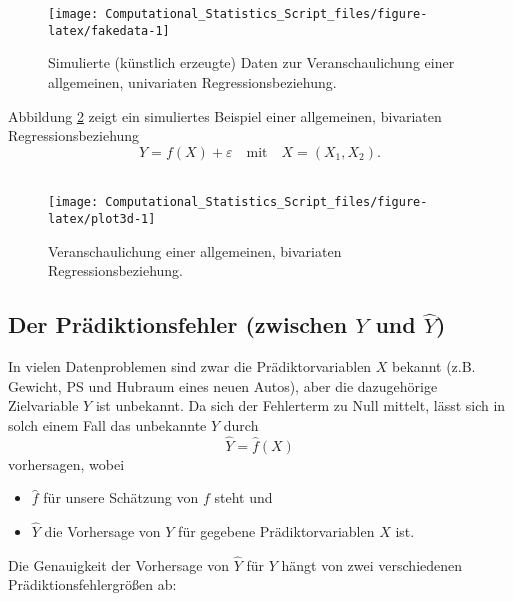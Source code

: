 \documentclass[
  ngerman,
]{book}
\providecommand{\tightlist}{%
  \setlength{\itemsep}{0pt}\setlength{\parskip}{0pt}}
\begin{document}
\begin{figure}[h]

{\centering \texttt{[image: Computational\_Statistics\_Script\_files/figure-latex/fakedata-1]} 

}

\caption{Simulierte (künstlich erzeugte) Daten zur Veranschaulichung einer allgemeinen, univariaten Regressionsbeziehung.}\label{fig:fakedata}
\end{figure}

Abbildung \ref{fig:plot3d} zeigt ein simuliertes Beispiel einer allgemeinen, bivariaten Regressionsbeziehung
\[
Y=f(X)+\varepsilon\quad\text{mit}\quad X=(X_1,X_2).
\]\\

\begin{figure}[h]

{\centering \texttt{[image: Computational\_Statistics\_Script\_files/figure-latex/plot3d-1]} 

}

\caption{Veranschaulichung einer allgemeinen, bivariaten Regressionsbeziehung.}\label{fig:plot3d}
\end{figure}

\hypertarget{der-pruxe4diktionsfehler-zwischen-y-und-haty}{%
\subsection{\texorpdfstring{Der Prädiktionsfehler (zwischen \(Y\) und \(\hat{Y}\))}{Der Prädiktionsfehler (zwischen Y und \textbackslash hat\{Y\})}}\label{der-pruxe4diktionsfehler-zwischen-y-und-haty}}

In vielen Datenproblemen sind zwar die Prädiktorvariablen \(X\) bekannt (z.B. Gewicht, PS und Hubraum eines neuen Autos), aber die dazugehörige Zielvariable \(Y\) ist unbekannt. Da sich der Fehlerterm zu Null mittelt, lässt sich in solch einem Fall das unbekannte \(Y\) durch
\[
\hat{Y}=\hat{f}(X)
\]
vorhersagen, wobei

\begin{itemize}
\tightlist
\item
  \(\hat{f}\) für unsere Schätzung von \(f\) steht und
\item
  \(\hat{Y}\) die Vorhersage von \(Y\) für gegebene Prädiktorvariablen \(X\) ist.
\end{itemize}

Die Genauigkeit der Vorhersage von \(\hat{Y}\) für \(Y\) hängt von zwei verschiedenen Prädiktionsfehlergrößen ab:
\end{document}
